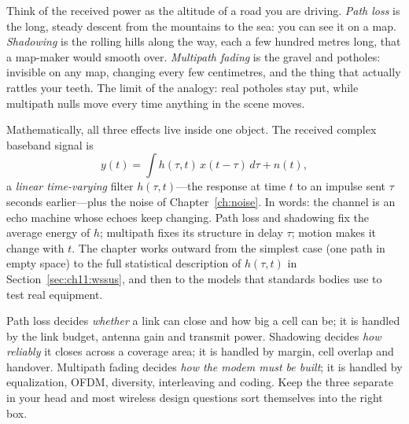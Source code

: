 
\begin{analogy}
Think of the received power as the altitude of a road you are driving. \emph{Path loss} is the
long, steady descent from the mountains to the sea: you can see it on a map. \emph{Shadowing} is
the rolling hills along the way, each a few hundred metres long, that a map-maker would smooth
over. \emph{Multipath fading} is the gravel and potholes: invisible on any map, changing every
few centimetres, and the thing that actually rattles your teeth. The limit of the analogy: real
potholes stay put, while multipath nulls move every time anything in the scene moves.
\end{analogy}

Mathematically, all three effects live inside one object. The received complex baseband
signal is
\begin{equation}
y(t)=\int h(\tau,t)\,x(t-\tau)\,d\tau+n(t),
\label{eq:ch11:ltv}
\end{equation}
a \emph{linear time-varying} filter $h(\tau,t)$---the response at time $t$ to an impulse sent
$\tau$ seconds earlier---plus the noise of Chapter~\ref{ch:noise}. In words: the channel is an
echo machine whose echoes keep changing. Path loss and shadowing fix the average energy of $h$;
multipath fixes its structure in delay $\tau$; motion makes it change with $t$. The chapter
works outward from the simplest case (one path in empty space) to the full statistical
description of $h(\tau,t)$ in Section~\ref{sec:ch11:wssus}, and then to the models that
standards bodies use to test real equipment.

\begin{keyidea}
Path loss decides \emph{whether} a link can close and how big a cell can be; it is handled by
the link budget, antenna gain and transmit power. Shadowing decides \emph{how reliably} it
closes across a coverage area; it is handled by margin, cell overlap and handover.
Multipath fading decides \emph{how the modem must be built}; it is handled by equalization,
OFDM, diversity, interleaving and coding. Keep the three separate in your head and most
wireless design questions sort themselves into the right box.
\end{keyidea}

